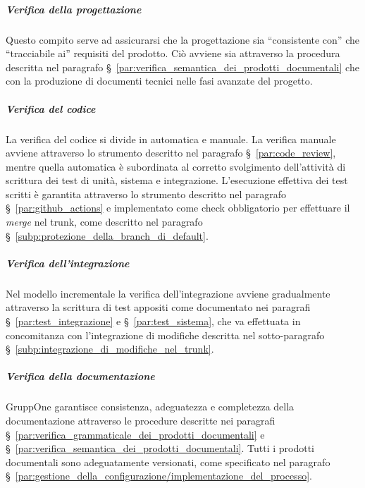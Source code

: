 \documentclass[../../norme-di-progetto.tex]{subfiles}
\begin{document}

\subparagraph{Verifica della progettazione}%
\label{subp:verifica_della_progettazione}

Questo compito serve ad assicurarsi che la progettazione sia ``consistente con'' che ``tracciabile ai'' requisiti del prodotto. Ciò avviene sia attraverso la procedura descritta nel paragrafo §~\ref{par:verifica_semantica_dei_prodotti_documentali} che con la produzione di documenti tecnici nelle fasi avanzate del progetto.


\subparagraph{Verifica del codice}%
\label{subp:verifica_del_codice}

La verifica del codice si divide in automatica e manuale.
La verifica manuale avviene attraverso lo strumento descritto nel paragrafo §~\ref{par:code_review}, mentre quella automatica è subordinata al corretto svolgimento dell'attività di scrittura dei test di unità, sistema e integrazione.
L'esecuzione effettiva dei test scritti è garantita attraverso lo strumento descritto nel paragrafo §~\ref{par:github_actions} e implementato come check obbligatorio per effettuare il \textit{merge} nel trunk, come descritto nel paragrafo §~\ref{subp:protezione_della_branch_di_default}.


\subparagraph{Verifica dell'integrazione}%
\label{subp:verifica_dell_integrazione}

Nel modello incrementale la verifica dell'integrazione avviene gradualmente attraverso la scrittura di test appositi come documentato nei paragrafi §~\ref{par:test_integrazione} e §~\ref{par:test_sistema}, che va effettuata in concomitanza con l'integrazione di modifiche descritta nel sotto-paragrafo §~\ref{subp:integrazione_di_modifiche_nel_trunk}.


\subparagraph{Verifica della documentazione}%
\label{subp:verifica_della_documentazione}

GruppOne garantisce consistenza, adeguatezza e completezza della documentazione attraverso le procedure descritte nei paragrafi §~\ref{par:verifica_grammaticale_dei_prodotti_documentali} e §~\ref{par:verifica_semantica_dei_prodotti_documentali}.
Tutti i prodotti documentali sono adeguatamente versionati, come specificato nel paragrafo §~\ref{par:gestione_della_configurazione/implementazione_del_processo}.
\end{document}
